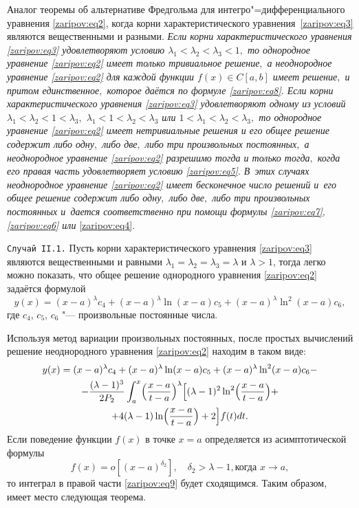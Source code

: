 \smallskip

{\small \sc Аналог теоремы об альтернативе Фредгольма для интегро"=дифференциального уравнения \eqref{zaripov:eq2}, когда корни характеристического уравнения~\eqref{zaripov:eq3} являются вещественными и разными.} 
\emph{Если корни характеристического уравнения \eqref{zaripov:eq3} удовлетворяют условию $\lambda_1< \lambda_2< \lambda_3<1,$  то однородное уравнение \eqref{zaripov:eq2} имеет только тривиальное решение$,$ а неоднородное уравнение \eqref{zaripov:eq2} для каждой функции $f(x)\in C[a,b]$    имеет решение$,$ и притом единственное$,$ которое даётся по формуле \eqref{zaripov:eq8}$.$ 
Если корни характеристического уравнения \eqref{zaripov:eq3} удовлетворяют одному из условий $\lambda_1< \lambda_2<1< \lambda_3,$ $\lambda_1<1< \lambda_2< \lambda_3$ или $1<\lambda_1< \lambda_2< \lambda_3,$  то однородное уравнение \eqref{zaripov:eq2} имеет нетривиальные решения и его общее решение содержит либо одну$,$ либо две$,$ либо три  произвольных постоянных$,$ а неоднородное уравнение \eqref{zaripov:eq2} разрешимо тогда и только тогда$,$ когда его правая часть удовлетворяет условию \eqref{zaripov:eq5}$.$ 
В~этих случаях неоднородное уравнение \eqref{zaripov:eq2} имеет бесконечное число решений и~его общее решение содержит либо одну$,$ либо две$,$ либо три произвольных постоянных и~дается соответственно при помощи формулы \eqref{zaripov:eq7}$,$ \eqref{zaripov:eq6} или} \eqref{zaripov:eq4}.

\smallskip

\texttt{Случай II.1.} 
Пусть корни характеристического уравнения \eqref{zaripov:eq3} являются вещественными и равными $\lambda_1=\lambda_2=\lambda_3=\lambda$ и $\lambda>1$, тогда легко можно показать, что общее решение однородного уравнения \eqref{zaripov:eq2} задаётся формулой 
$$
y(x)={(x-a)^{\lambda}}c_4+{(x-a)^{\lambda}}\ln(x-a) c_5+{(x-a)^{\lambda}}\ln^2(x-a)c_6,
$$
где $c_4$, $c_5$, $c_6$   "--- произвольные постоянные числа.

 Используя метод вариации произвольных постоянных, после простых вычислений решение неоднородного уравнения \eqref{zaripov:eq2} находим в таком виде:
 \begin{multline}
y(x)={(x-a)^{\lambda}}c_4+{(x-a)^{\lambda}}\ln(x-a) c_5+{(x-a)^{\lambda}}\ln^2(x-a)c_6-\\
-\frac{(\lambda-1)^3}{2P_2}\int _{a}^{x}
\Bigl(\frac{x-a}{t-a}\Bigr)^\lambda
\Bigl[(\lambda-1)^2\ln^2\Bigl(\frac{x-a}{t-a}\Bigr)+\\
+4(\lambda-1)\ln
\Bigl(\frac{x-a}{t-a}\Bigr)+2\Bigr]f(t)dt.
\label{zaripov:eq9}
\end{multline}
Если поведение функции $f(x)$  в точке $x=a$  определяется из асимптотической формулы
\begin{equation}
f(x)=o\left[\left(x-a\right)^{\delta_2}\right], \quad  \delta_2>\lambda-1, \text{когда $x\rightarrow{a}$},\label{zaripov:eq10}
\end{equation}
то интеграл в правой части \eqref{zaripov:eq9} будет сходящимся.
Таким образом, имеет место следующая теорема.

